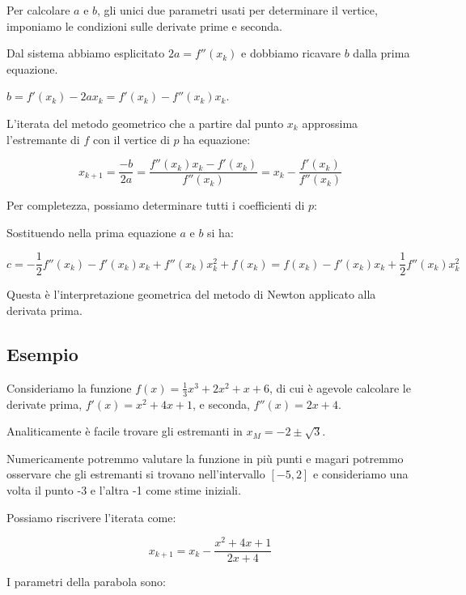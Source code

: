 \documentclass[12pt]{article}
\theoremstyle{plain}%
\theoremstyle{definition}
\theoremstyle{remark}
\begin{document}
Per calcolare $a$ e $b$, gli unici due parametri usati per determinare il vertice, imponiamo le condizioni sulle
derivate prime e seconda.


Dal sistema abbiamo esplicitato $2a = f''(x_k)$ e dobbiamo ricavare $b$ dalla prima equazione.

$b = f'(x_k) - 2a x_k = f'(x_k) - f''(x_k) x_k$.

L'iterata del metodo geometrico che a partire dal punto $x_k$ approssima l'estremante di $f$
con il vertice di $p$ ha equazione:

$$x_{k+1} = \frac{-b}{2a} = \frac{f''(x_k) x_k - f'(x_k)}{f''(x_k)} = x_k - \frac{f'(x_k)}{f''(x_k)}$$

Per completezza, possiamo determinare tutti i coefficienti di $p$:


Sostituendo nella prima equazione $a$ e $b$ si ha:

$$c = - \frac{1}{2} f''(x_k) - f'(x_k) x_k + f''(x_k) x_k^2 + f(x_k) = f(x_k)  - f'(x_k) x_k + \frac{1}{2} f''(x_k) x_k^2$$


Questa è l'interpretazione geometrica del metodo di Newton applicato alla derivata prima.

\subsection{Esempio}

Consideriamo la funzione $f(x) = \frac{1}{3} x^3 + 2 x^2 + x + 6$, di cui è agevole
calcolare le derivate prima, $f'(x) = x^2 + 4 x + 1$, e seconda, $f''(x) = 2x + 4$.

Analiticamente è facile trovare gli estremanti in $x_M = -2 \pm \sqrt{3}$.

Numericamente potremmo valutare la funzione in più punti e magari potremmo osservare
che gli estremanti si trovano nell'intervallo $[-5, 2]$ e consideriamo una volta il
punto -3 e l'altra -1 come stime iniziali.

Possiamo riscrivere l'iterata come:

$$x_{k+1} = x_k - \frac{x^2 + 4 x + 1}{2x + 4}$$

I parametri della parabola sono:

\end{document}
